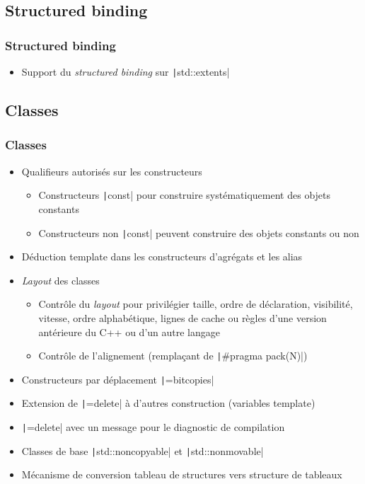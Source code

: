 \documentclass[C++.tex]{subfiles}
\begin{document}
\subsection*{Structured binding}
\begin{frame}[fragile]
	\frametitle{Structured binding}
	\begin{itemize}
		\item Support du \textit{structured binding} sur \texttt|std::extents|
	\end{itemize}
\end{frame}


\subsection*{Classes}
\begin{frame}[fragile]
	\frametitle{Classes}
	\begin{itemize}
		\item Qualifieurs autorisés sur les constructeurs
		\begin{itemize}
			\item Constructeurs \texttt|const| pour construire systématiquement des objets constants
			\item Constructeurs non \texttt|const| peuvent construire des objets constants ou non
		\end{itemize}
		\item Déduction template dans les constructeurs d'agrégats et les alias
		\item \textit{Layout} des classes
		\begin{itemize}
			\item Contrôle du \textit{layout} pour privilégier taille, ordre de déclaration, visibilité, vitesse, ordre alphabétique, lignes de cache ou règles d'une version antérieure du C++ ou d'un autre langage
			\item Contrôle de l'alignement (remplaçant de \texttt|#pragma pack(N)|)
		\end{itemize}
		\item Constructeurs par déplacement \texttt|=bitcopies|
		\item Extension de \texttt|=delete| à d'autres construction (variables template)
		\item \texttt|=delete| avec un message pour le diagnostic de compilation
		\item Classes de base \texttt|std::noncopyable| et \texttt|std::nonmovable|
		\item Mécanisme de conversion tableau de structures vers structure de tableaux

	\end{itemize}
\end{frame}
\end{document}
